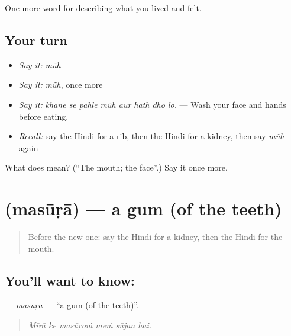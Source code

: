 \begin{grammarlens}[title={What you've built}]
One more word for describing what you lived and felt.
\end{grammarlens}

\subsection*{Your turn}
\begin{itemize}
\raggedright
  \item \emph{Say it:} \emph{mũh}
  \item \emph{Say it:} \emph{mũh}, once more
  \item \emph{Say it:} \emph{khāne se pahle mũh aur hāth dho lo.} — Wash your face and hands before eating.
  \item \emph{Recall:} say the Hindi for a rib, then the Hindi for a kidney, then say \emph{mũh} again
\end{itemize}

\begin{tcolorbox}[breakable,colback=teal!4,colframe=teal!35!black,title={Before you move on}]
What does  mean? (\textquotedblleft{}The mouth; the face\textquotedblright{}.) Say it once more.
\end{tcolorbox}
\section[\texorpdfstring{\hi{मसूड़ा} (masūṛā)}{मसूड़ा (masūṛā)}]{ (masūṛā) — a gum (of the teeth)}

\label{lesson:HI-C479-masura}



\begin{quote}
Before the new one: say the Hindi for a kidney, then the Hindi for the mouth.
\end{quote}

\subsection*{You'll want to know: }
\textbf{} — \emph{masūṛā} — \textquotedblleft{}a gum (of the teeth)\textquotedblright{}.

\begin{quote}
     
\end{quote}

\begin{quote}
\emph{Mīrā ke masūṛoṁ meṁ sūjan hai.}
\end{quote}

